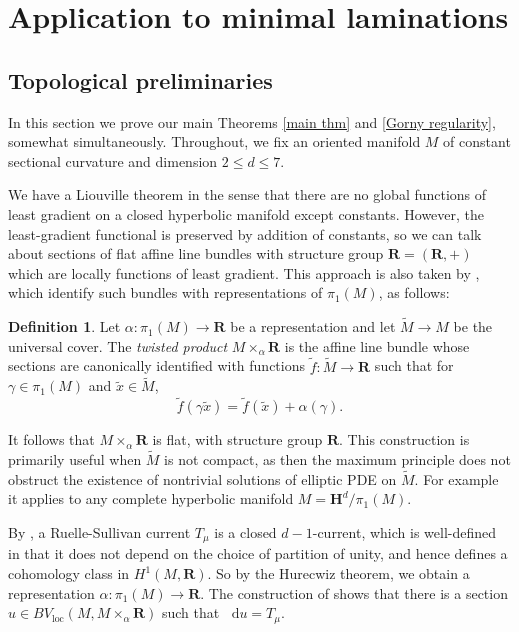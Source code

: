 \documentclass[reqno,10pt]{amsart}
\newcommand{\RR}{\mathbf{R}}
\newcommand{\Hyp}{\mathbf H}
\newcommand*\dif{\mathop{}\!\mathrm{d}}
\newcommand{\dfn}[1]{\emph{#1}\index{#1}}
\newcommand{\loc}{\mathrm{loc}}
\theoremstyle{definition}
\newtheorem{definition}[theorem]{Definition}
\numberwithin{equation}{section}
\begin{document}
\section{Application to minimal laminations}\label{GornySec}
\subsection{Topological preliminaries} \label{LamPrelim}
In this section we prove our main Theorems \ref{main thm} and \ref{Gorny regularity}, somewhat simultaneously.
Throughout, we fix an oriented manifold $M$ of constant sectional curvature and dimension $2 \leq d \leq 7$.

We have a Liouville theorem in the sense that there are no global functions of least gradient on a closed hyperbolic manifold except constants.
However, the least-gradient functional is preserved by addition of constants, so we can talk about sections of flat affine line bundles with structure group $\RR = (\RR, +)$ which are locally functions of least gradient.
This approach is also taken by \cite[\S2.1]{daskalopoulos2020transverse}, which identify such bundles with representations of $\pi_1(M)$, as follows:

\begin{definition}
Let $\alpha: \pi_1(M) \to \RR$ be a representation and let $\tilde M \to M$ be the universal cover.
The \dfn{twisted product} $M \times_\alpha \RR$ is the affine line bundle whose sections are canonically identified with functions $\tilde f: \tilde M \to \RR$ such that for $\gamma \in \pi_1(M)$ and $\tilde x \in \tilde M$,
$$\tilde f(\gamma \tilde x) = \tilde f(\tilde x) + \alpha(\gamma).$$
\end{definition}

It follows that $M \times_\alpha \RR$ is flat, with structure group $\RR$.
This construction is primarily useful when $\tilde M$ is not compact, as then the maximum principle does not obstruct the existence of nontrivial solutions of elliptic PDE on $\tilde M$.
For example it applies to any complete hyperbolic manifold $M = \Hyp^d/\pi_1(M)$.

By \cite{Ruelle75}, a Ruelle-Sullivan current $T_\mu$ is a closed $d-1$-current, which is well-defined in that it does not depend on the choice of partition of unity, and hence defines a cohomology class in $H^1(M, \RR)$. So by the Hurecwiz theorem, we obtain a representation $\alpha: \pi_1(M) \to \RR$.
The construction of \cite[Theorem 8.3]{daskalopoulos2020transverse} shows that there is a section $u \in BV_\loc(M, M \times_\alpha \RR)$ such that $\dif u = T_\mu$.
\end{document}

